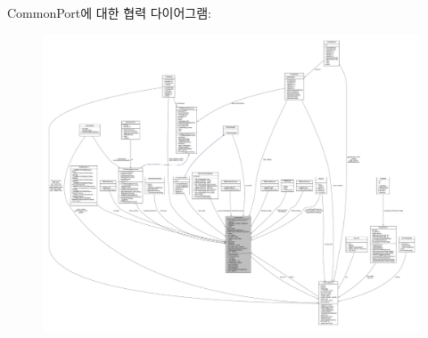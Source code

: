 Common\+Port에 대한 협력 다이어그램\+:
\nopagebreak
\begin{figure}[H]
\begin{center}
\leavevmode
\includegraphics[width=350pt]{class_common_port__coll__graph}
\end{center}
\end{figure}
